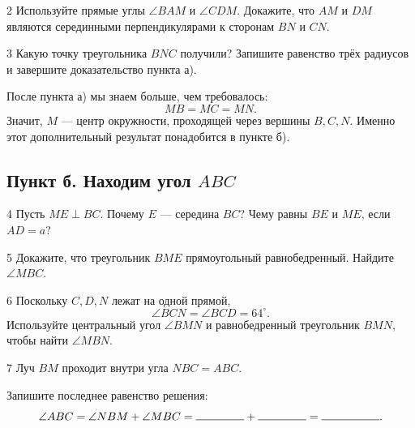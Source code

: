 \begin{stepbox}{2}
Используйте прямые углы \(\angle BAM\) и \(\angle CDM\). Докажите, что
\(AM\) и \(DM\) являются серединными перпендикулярами к сторонам \(BN\)
и \(CN\).
\answerline[4]
\end{stepbox}

\begin{stepbox}{3}
Какую точку треугольника \(BNC\) получили? Запишите равенство трёх радиусов
и завершите доказательство пункта а).
\answerline[4]
\end{stepbox}

\begin{importantbox}
После пункта а) мы знаем больше, чем требовалось:
\[
\boxed{MB=MC=MN}.
\]
Значит, \(M\) — центр окружности, проходящей через вершины \(B,C,N\).
Именно этот дополнительный результат понадобится в пункте б).
\end{importantbox}

\subsection{Пункт б. Находим угол \(ABC\)}

\begin{stepbox}{4}
Пусть \(ME\perp BC\). Почему \(E\) — середина \(BC\)? Чему равны
\(BE\) и \(ME\), если \(AD=a\)?
\answerline[3]
\end{stepbox}

\begin{stepbox}{5}
Докажите, что треугольник \(BME\) прямоугольный равнобедренный. Найдите
\(\angle MBC\).
\answerline[3]
\end{stepbox}

\begin{stepbox}{6}
Поскольку \(C,D,N\) лежат на одной прямой,
\[
\angle BCN=\angle BCD=64^\circ.
\]
Используйте центральный угол \(\angle BMN\) и равнобедренный треугольник
\(BMN\), чтобы найти \(\angle MBN\).
\answerline[4]
\end{stepbox}

\begin{stepbox}{7}
Луч \(BM\) проходит внутри угла \(NBC=ABC\).

\anglesumfigure

Запишите последнее равенство решения:
\[
\angle ABC=\angle NBM+\angle MBC
=\shortanswer{15mm}+\shortanswer{15mm}
=\shortanswer{18mm}.
\]
\end{stepbox}

